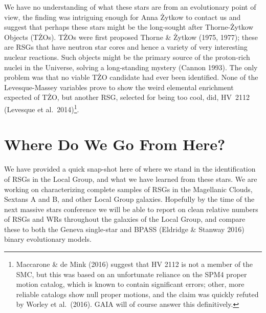 \documentclass{iau}
\begin{document}
We have no understanding of what these stars are from an evolutionary point of view, the finding was intriguing enough for Anna \.{Z}ytkow to contact us and suggest that perhaps these stars might be the long-sought after Thorne-\.{Z}ytkow Objects (T\.{Z}Os).  T\.{Z}Os were first proposed  Thorne \& \.{Z}ytkow (1975, 1977); these are RSGs that
have neutron star cores and hence a variety of very interesting nuclear reactions.  Such objects might be the
primary source of the proton-rich nuclei in the Universe, solving a long-standing mystery (Cannon 1993).  The only problem was that no viable T\.{Z}O candidate had ever been identified.  None of the Levesque-Massey variables prove to show the
weird elemental enrichment expected of T\.{Z}O, but another RSG, selected for being too cool, did, HV~2112 (Levesque et al.\ 
2014)\footnote{Maccarone \& de Mink (2016) suggest that HV 2112 is not a member of the SMC, but this was based on an unfortunate reliance on the SPM4 proper motion catalog, which is known to contain significant errors; other, more reliable catalogs show null proper motions, and the claim was quickly refuted by Worley et al.\ (2016).  GAIA will of course answer this definitively.}.

\section{Where Do We Go From Here?}
We have provided a quick snap-shot here of where we stand in the identification of RSGs in the Local Group, and what we have learned from these stars.  We are working on characterizing complete samples of RSGs in the Magellanic Clouds, Sextans A and B, and other Local Group galaxies.  Hopefully by the time of the next massive stars conference we will be able to
report on clean relative numbers of RSGs and WRs throughout the galaxies of the Local Group, and compare these to both the Geneva single-star and BPASS (Eldridge \& Stanway 2016) binary evolutionary models.
\end{document}
